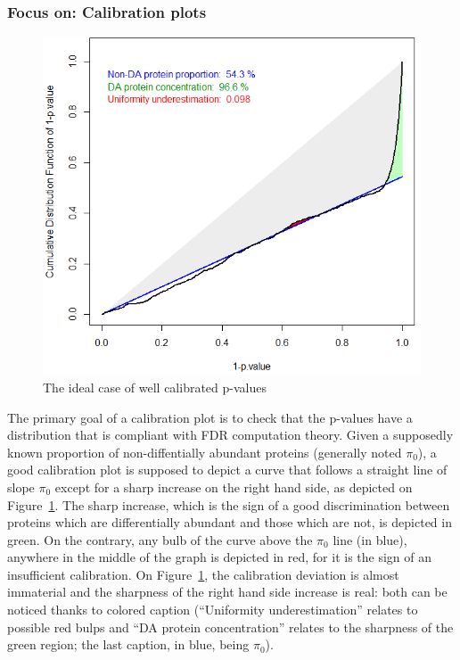 \documentclass[12pt]{article}
\begin{document}
\subsubsection{Focus on: Calibration plots}\label{sec:cp4p}

\begin {figure}
\includegraphics[width=\textwidth]{images/cp4p-ideal.png}
\caption{The ideal case of well calibrated p-values}\label{fig:cp4p-ideal}
\end {figure}

The primary goal of a calibration plot is to check that the p-values have a distribution that is compliant with FDR computation theory.
Given a supposedly known proportion of non-diffentially abundant proteins (generally noted $\pi_0$), a good calibration plot is supposed to depict a curve that follows a straight line of slope $\pi_0$ except for a sharp increase on the right hand side, as depicted on Figure~\ref{fig:cp4p-ideal}. The sharp increase, which is the sign of a good discrimination between proteins which are differentially abundant and those which are not, is depicted in green. On the contrary, any bulb of the curve above the $\pi_0$ line (in blue), anywhere in the middle of the graph is depicted in red, for it is the sign of an insufficient calibration. On Figure~\ref{fig:cp4p-ideal}, the calibration deviation is almost immaterial and the sharpness of the right hand side increase is real: both can be noticed thanks to colored caption (``Uniformity underestimation'' relates to possible red bulps and ``DA protein concentration'' relates to the sharpness of the green region; the last caption, in blue, being $\pi_0$).
\end{document}
